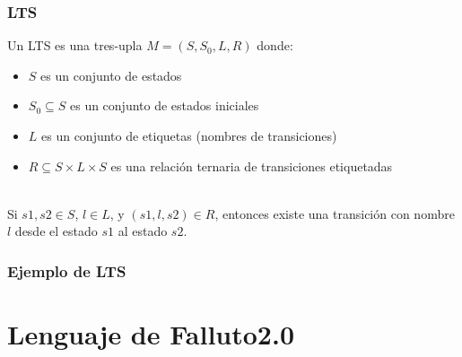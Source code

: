 \documentclass[serif]{beamer}
\begin{document}
\begin{frame}
\frametitle{LTS}
Un LTS es una tres-upla $M = (S,S_{0},L,R)$ donde:\\[0.3cm]
\begin{itemize}\itemsep10pt
\item $S$ es un conjunto de estados
\item $S_0 \subseteq S$ es un conjunto de estados iniciales
\item $L$ es un conjunto de etiquetas (nombres de transiciones)
\item $R \subseteq S \times L \times S$ es una relación ternaria de transiciones 
etiquetadas
\end{itemize}
~\\
Si $s1, s2 \in S$, $l \in L$, y $(s1,l,s2) \in R$, entonces existe una 
transición con nombre $l$ desde el estado $s1$ al estado $s2$.
\end{frame}


\begin{frame}
\frametitle{Ejemplo de LTS}
\end{frame}




\section[Lenguaje]{Lenguaje de Falluto2.0}
\end{document}

